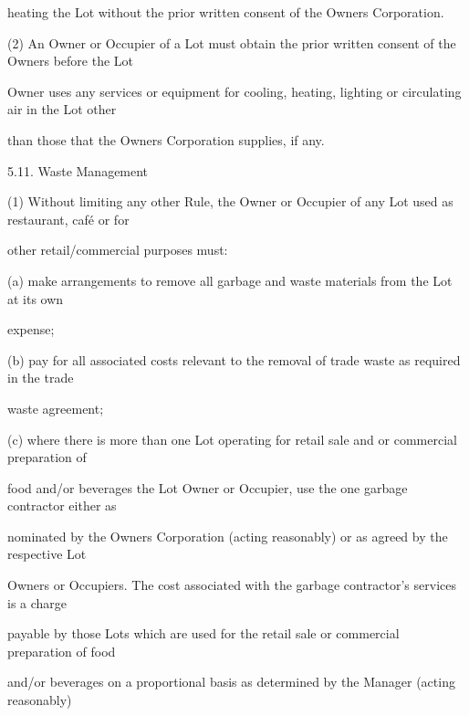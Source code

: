 \documentclass{article}
\begin{document}
{\fontsize{10.02}{1}heating the Lot without the prior written consent of the Owners Corporation. }

{\fontsize{9.962}{1}(2) An Owner or Occupier of a Lot must obtain the prior written consent of the Owners before the Lot }

{\fontsize{10.02}{1}Owner uses any services or equipment for cooling, heating, lighting or circulating air in the Lot other }

{\fontsize{10.02}{1}than those that the Owners Corporation supplies, if any. }

{\fontsize{9.99}{1}5.11. Waste Management }

{\fontsize{9.962}{1}(1) Without limiting any other Rule, the Owner or Occupier of any Lot used as restaurant, café or for }

{\fontsize{10.02}{1}other retail/commercial purposes must: }

{\fontsize{9.962}{1}(a) make arrangements to remove all garbage and waste materials from the Lot at its own }

{\fontsize{10.02}{1}expense; }

{\fontsize{9.962}{1}(b) pay for all associated costs relevant to the removal of trade waste as required in the trade }

{\fontsize{10.02}{1}waste agreement; }

{\fontsize{9.962}{1}(c) where there is more than one Lot operating for retail sale and or commercial preparation of }

\newpage


















{\fontsize{10.02}{1}food and/or beverages the Lot Owner or Occupier, use the one garbage contractor either as }

{\fontsize{10.02}{1}nominated by the Owners Corporation (acting reasonably) or as agreed by the respective Lot }

{\fontsize{10.02}{1}Owners or Occupiers. The cost associated with the garbage contractor’s services is a charge }

{\fontsize{10.02}{1}payable by those Lots which are used for the retail sale or commercial preparation of food }

{\fontsize{10.02}{1}and/or beverages on a proportional basis as determined by the Manager (acting reasonably) }
\end{document}
